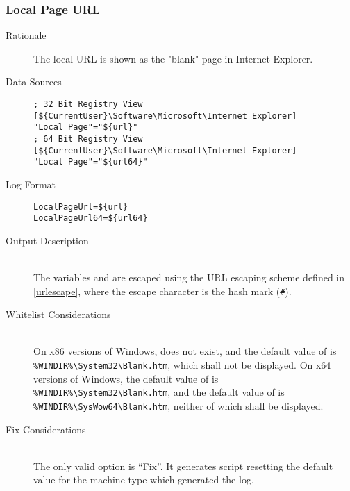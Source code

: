 \subsubsection{Local Page URL}
\begin{description}
\item[Rationale] The local URL is shown as the "blank" page in Internet
Explorer.

\item[Data Sources] \hfill
\vspace{-\baselineskip}
\begin{verbatim}
; 32 Bit Registry View
[${CurrentUser}\Software\Microsoft\Internet Explorer]
"Local Page"="${url}"
; 64 Bit Registry View
[${CurrentUser}\Software\Microsoft\Internet Explorer]
"Local Page"="${url64}"
\end{verbatim}
\item[Log Format] \hfill
\vspace{-\baselineskip}
\begin{verbatim} 
LocalPageUrl=${url}
LocalPageUrl64=${url64}
\end{verbatim}
\item[Output Description] \hfill \\
The variables  and  are escaped using the URL escaping
scheme defined in \ref{urlescape}, where the escape character is the hash mark
(\verb|#|).
\item[Whitelist Considerations] \hfill \\
On x86 versions of Windows,  does not exist, and the default value of
 is \verb|%WINDIR%\System32\Blank.htm|, which shall not be displayed.
On x64 versions of Windows, the default value of  is
\verb|%WINDIR%\System32\Blank.htm|, and the default value of  is
\verb|%WINDIR%\SysWow64\Blank.htm|, neither of which shall be displayed.
\item[Fix Considerations] \hfill \\
The only valid option is ``Fix''. It generates script resetting the default
value for the machine type which generated the log.
\end{description}

